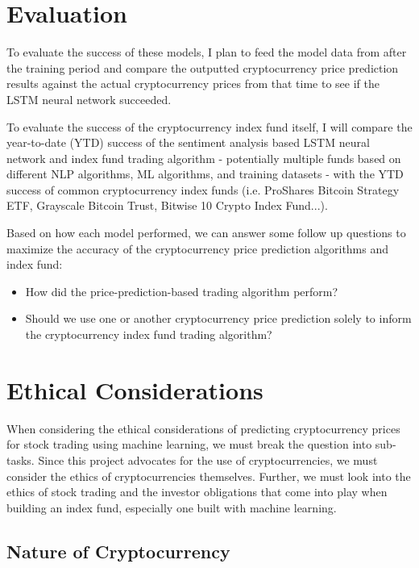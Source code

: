 \documentclass[10pt,twocolumn]{article}
\begin{document}
\section{Evaluation}

To evaluate the success of these models, I plan to feed the model data from after the training period and compare the outputted cryptocurrency price prediction results against the actual cryptocurrency prices from that time to see if the LSTM neural network succeeded.

To evaluate the success of the cryptocurrency index fund itself, I will compare the year-to-date (YTD) success of the sentiment analysis based LSTM neural network and index fund trading algorithm - potentially multiple funds based on different NLP algorithms, ML algorithms, and training datasets - with the YTD success of common cryptocurrency index funds (i.e. ProShares Bitcoin Strategy ETF, Grayscale Bitcoin Trust, Bitwise 10 Crypto Index Fund...).

Based on how each model performed, we can answer some follow up questions to maximize the accuracy of the cryptocurrency price prediction algorithms and index fund:

\begin{itemize}
    \item How did the price-prediction-based trading algorithm perform?
    \item Should we use one or another cryptocurrency price prediction solely to inform the cryptocurrency index fund trading algorithm?
\end{itemize}

\section{Ethical Considerations}

When considering the ethical considerations of predicting cryptocurrency prices for stock trading using machine learning, we must break the question into sub-tasks. Since this project advocates for the use of cryptocurrencies, we must consider the ethics of cryptocurrencies themselves. Further, we must look into the ethics of stock trading and the investor obligations that come into play when building an index fund, especially one built with machine learning.

\subsection{Nature of Cryptocurrency}
\end{document}
